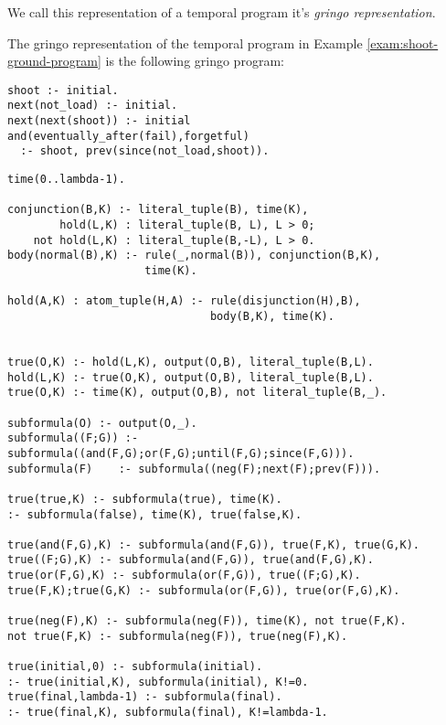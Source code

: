 We call this representation of a temporal program it's \emph{gringo
  representation}.

\begin{example}\label{exam:shoot-ground-symbolic}
  The gringo representation of the temporal program in Example
  \ref{exam:shoot-ground-program} is the following gringo program:
\begin{center}
    \begin{lstlisting}[numbers=none]
shoot :- initial.
next(not_load) :- initial.
next(next(shoot)) :- initial
and(eventually_after(fail),forgetful) 
  :- shoot, prev(since(not_load,shoot)).
    \end{lstlisting}
\end{center}
\end{example}

\begin{center}
\begin{minipage}{\linewidth}
\begin{lstlisting}[language=clingo, label={lst:meta-telingo-one}]
time(0..lambda-1).

conjunction(B,K) :- literal_tuple(B), time(K),
        hold(L,K) : literal_tuple(B, L), L > 0;
    not hold(L,K) : literal_tuple(B,-L), L > 0.
body(normal(B),K) :- rule(_,normal(B)), conjunction(B,K), 
                     time(K).

hold(A,K) : atom_tuple(H,A) :- rule(disjunction(H),B), 
                               body(B,K), time(K).


true(O,K) :- hold(L,K), output(O,B), literal_tuple(B,L).
hold(L,K) :- true(O,K), output(O,B), literal_tuple(B,L).
true(O,K) :- time(K), output(O,B), not literal_tuple(B,_).

subformula(O) :- output(O,_).
subformula((F;G)) :- subformula((and(F,G);or(F,G);until(F,G);since(F,G))).
subformula(F)	 :- subformula((neg(F);next(F);prev(F))).

true(true,K) :- subformula(true), time(K).
:- subformula(false), time(K), true(false,K).

true(and(F,G),K) :- subformula(and(F,G)), true(F,K), true(G,K).
true((F;G),K) :- subformula(and(F,G)), true(and(F,G),K).
true(or(F,G),K) :- subformula(or(F,G)), true((F;G),K).
true(F,K);true(G,K) :- subformula(or(F,G)), true(or(F,G),K).

true(neg(F),K) :- subformula(neg(F)), time(K), not true(F,K).
not true(F,K) :- subformula(neg(F)), true(neg(F),K).

true(initial,0) :- subformula(initial).
:- true(initial,K), subformula(initial), K!=0.
true(final,lambda-1) :- subformula(final).
:- true(final,K), subformula(final), K!=lambda-1.


\end{lstlisting}
\end{minipage}
\end{center}

